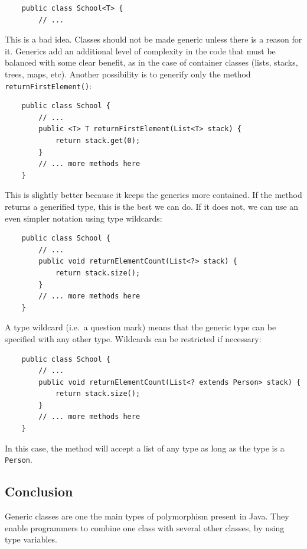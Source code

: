 \begin{verbatim}
    public class School<T> {
        // ...
\end{verbatim}

This is a bad idea. Classes should not be made generic unless there is
a reason for it. Generics add an additional level of complexity in the
code that must be balanced with some clear benefit, as in the case of
container classes (lists, stacks, trees, maps, etc). Another
possibility is to generify only the method
\verb+returnFirstElement()+: 

\begin{verbatim}
    public class School {
        // ...
        public <T> T returnFirstElement(List<T> stack) {
            return stack.get(0); 
        }
        // ... more methods here
    }
\end{verbatim}

This is slightly better because it keeps the generics more
contained. If the method returns a generified type, this is the best
we can do. If it does not, we can use an even simpler notation using
type wildcards: 

\begin{verbatim}
    public class School {
        // ...
        public void returnElementCount(List<?> stack) {
            return stack.size();
        }
        // ... more methods here
    }
\end{verbatim}

A type wildcard (i.e.~a question mark) means that the generic
type can be specified with any other type. Wildcards can be restricted
if necessary: 

\begin{verbatim}
    public class School {
        // ...
        public void returnElementCount(List<? extends Person> stack) {
            return stack.size();
        }
        // ... more methods here
    }
\end{verbatim}

In this case, the method will accept a list of any type as long as the
type is a \verb+Person+. 


\subsection{Conclusion}
\label{sec:conclusion-2}

Generic classes are one the main types of polymorphism present in
Java. They enable programmers to combine one class with several other
classes, by using type variables. 


